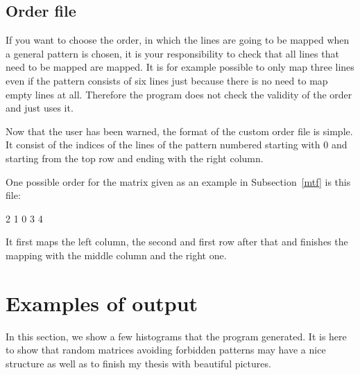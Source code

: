 \subsection{Order file}
\label{of}
If you want to choose the order, in which the lines are going to be mapped when a general pattern is chosen, it is your responsibility to check that all lines that need to be mapped are mapped. It is for example possible to only map three lines even if the pattern consists of six lines just because there is no need to map empty lines at all. Therefore the program does not check the validity of the order and just uses it.

Now that the user has been warned, the format of the custom order file is simple. It consist of the indices of the lines of the pattern numbered starting with 0 and starting from the top row and ending with the right column.

One possible order for the matrix given as an example in Subsection~\ref{mtf} is this file:
\begin{center}
2 1 0 3 4
\end{center}
It first maps the left column, the second and first row after that and finishes the mapping with the middle column and the right one.
\section{Examples of output}
In this section, we show a few histograms that the program generated. It is here to show that random matrices avoiding forbidden patterns may have a nice structure as well as to finish my thesis with beautiful pictures.

